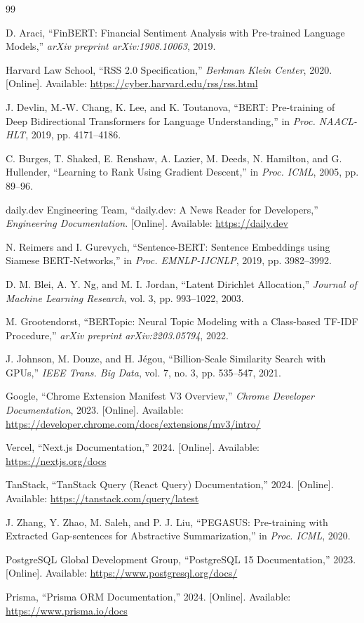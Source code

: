 \documentclass[conference]{IEEEtran}
\begin{document}
\begin{thebibliography}{99}

D. Araci, ``FinBERT: Financial Sentiment Analysis with Pre-trained Language Models,'' \textit{arXiv preprint arXiv:1908.10063}, 2019.

Harvard Law School, ``RSS 2.0 Specification,'' \textit{Berkman Klein Center}, 2020. [Online]. Available: \url{https://cyber.harvard.edu/rss/rss.html}

J. Devlin, M.-W. Chang, K. Lee, and K. Toutanova, ``BERT: Pre-training of Deep Bidirectional Transformers for Language Understanding,'' in \textit{Proc. NAACL-HLT}, 2019, pp. 4171--4186.

C. Burges, T. Shaked, E. Renshaw, A. Lazier, M. Deeds, N. Hamilton, and G. Hullender, ``Learning to Rank Using Gradient Descent,'' in \textit{Proc. ICML}, 2005, pp. 89--96.

daily.dev Engineering Team, ``daily.dev: A News Reader for Developers,'' \textit{Engineering Documentation}. [Online]. Available: \url{https://daily.dev}

N. Reimers and I. Gurevych, ``Sentence-BERT: Sentence Embeddings using Siamese BERT-Networks,'' in \textit{Proc. EMNLP-IJCNLP}, 2019, pp. 3982--3992.

D. M. Blei, A. Y. Ng, and M. I. Jordan, ``Latent Dirichlet Allocation,'' \textit{Journal of Machine Learning Research}, vol. 3, pp. 993--1022, 2003.

M. Grootendorst, ``BERTopic: Neural Topic Modeling with a Class-based TF-IDF Procedure,'' \textit{arXiv preprint arXiv:2203.05794}, 2022.

J. Johnson, M. Douze, and H. J{\'e}gou, ``Billion-Scale Similarity Search with GPUs,'' \textit{IEEE Trans. Big Data}, vol. 7, no. 3, pp. 535--547, 2021.

Google, ``Chrome Extension Manifest V3 Overview,'' \textit{Chrome Developer Documentation}, 2023. [Online]. Available: \url{https://developer.chrome.com/docs/extensions/mv3/intro/}

Vercel, ``Next.js Documentation,'' 2024. [Online]. Available: \url{https://nextjs.org/docs}

TanStack, ``TanStack Query (React Query) Documentation,'' 2024. [Online]. Available: \url{https://tanstack.com/query/latest}

J. Zhang, Y. Zhao, M. Saleh, and P. J. Liu, ``PEGASUS: Pre-training with Extracted Gap-sentences for Abstractive Summarization,'' in \textit{Proc. ICML}, 2020.

PostgreSQL Global Development Group, ``PostgreSQL 15 Documentation,'' 2023. [Online]. Available: \url{https://www.postgresql.org/docs/}

Prisma, ``Prisma ORM Documentation,'' 2024. [Online]. Available: \url{https://www.prisma.io/docs}

\end{thebibliography}
\end{document}
